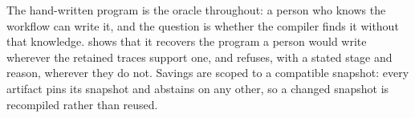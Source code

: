 The hand-written program is the oracle throughout: a person who knows the workflow can write it, and the question is whether the compiler finds it without that knowledge.
 shows that it recovers the program a person would write wherever the retained traces support one, and refuses, with a stated stage and reason, wherever they do not.
Savings are scoped to a compatible snapshot: every artifact pins its snapshot and abstains on any other, so a changed snapshot is recompiled rather than reused.
